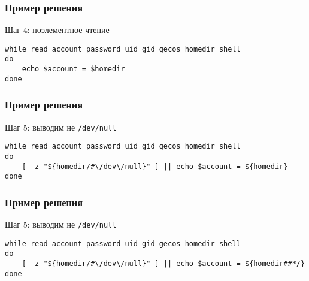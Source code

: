 \begin{frame}[fragile]
	\frametitle{Пример решения}

	\begin{block}{Шаг 4: поэлементное чтение}

	\begin{lstlisting}
while read account password uid gid gecos homedir shell
do
    echo $account = $homedir
done
	\end{lstlisting}

	\end{block}
\end{frame}

\begin{frame}[fragile]
	\frametitle{Пример решения}

	\begin{block}{Шаг 5: выводим не {\tt /dev/null}}

	\begin{lstlisting}
while read account password uid gid gecos homedir shell
do
    [ -z "${homedir/#\/dev\/null}" ] || echo $account = ${homedir}
done
	\end{lstlisting}

	\end{block}
\end{frame}

\begin{frame}[fragile]
	\frametitle{Пример решения}

	\begin{block}{Шаг 5: выводим не {\tt /dev/null}}

	\begin{lstlisting}
while read account password uid gid gecos homedir shell
do
    [ -z "${homedir/#\/dev\/null}" ] || echo $account = ${homedir##*/}
done
	\end{lstlisting}

	\end{block}
\end{frame}


